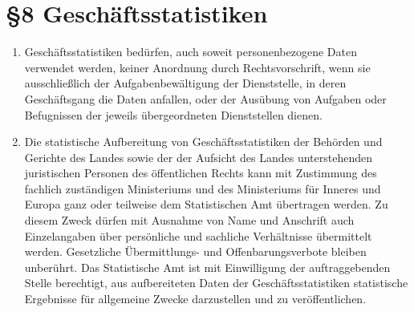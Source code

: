     \section{\S8 Geschäftsstatistiken}
        \begin{enumerate}[label=(\arabic*)]
            \item Geschäftsstatistiken bedürfen, auch soweit personenbezogene Daten verwendet werden, keiner Anordnung durch Rechtsvorschrift, wenn sie ausschließlich der Aufgabenbewältigung der Dienststelle, in deren Geschäftsgang die Daten anfallen, oder der Ausübung von Aufgaben oder Befugnissen der jeweils übergeordneten Dienststellen dienen.
            \item Die statistische Aufbereitung von Geschäftsstatistiken der Behörden und Gerichte des Landes sowie der der Aufsicht des Landes unterstehenden juristischen Personen des öffentlichen Rechts kann mit Zustimmung des fachlich zuständigen Ministeriums und des Ministeriums für Inneres und Europa ganz oder teilweise dem Statistischen Amt übertragen werden. Zu diesem Zweck dürfen mit Ausnahme von Name und Anschrift auch Einzelangaben über persönliche und sachliche Verhältnisse übermittelt werden. Gesetzliche Übermittlungs- und Offenbarungsverbote bleiben unberührt. Das Statistische Amt ist mit Einwilligung der auftraggebenden Stelle berechtigt, aus aufbereiteten Daten der Geschäftsstatistiken statistische Ergebnisse für allgemeine Zwecke darzustellen und zu veröffentlichen.
        \end{enumerate}

